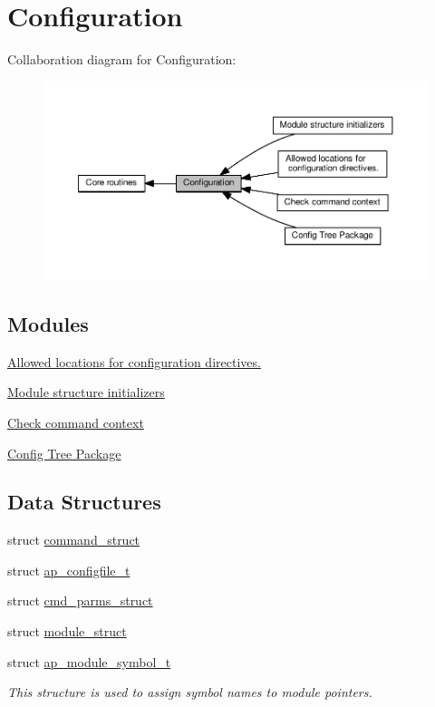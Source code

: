 \hypertarget{group__APACHE__CORE__CONFIG}{}\section{Configuration}
\label{group__APACHE__CORE__CONFIG}
Collaboration diagram for Configuration\+:
\nopagebreak
\begin{figure}[H]
\begin{center}
\leavevmode
\includegraphics[width=350pt]{group__APACHE__CORE__CONFIG}
\end{center}
\end{figure}
\subsection*{Modules}
\begin{DoxyCompactItemize}
\item 
\hyperlink{group__ConfigDirectives}{Allowed locations for configuration directives.}
\item 
\hyperlink{group__ModuleInit}{Module structure initializers}
\item 
\hyperlink{group__ap__check__cmd__context}{Check command context}
\item 
\hyperlink{group__APACHE__CORE__CONFIG__TREE}{Config Tree Package}
\end{DoxyCompactItemize}
\subsection*{Data Structures}
\begin{DoxyCompactItemize}
\item 
struct \hyperlink{structcommand__struct}{command\+\_\+struct}
\item 
struct \hyperlink{structap__configfile__t}{ap\+\_\+configfile\+\_\+t}
\item 
struct \hyperlink{structcmd__parms__struct}{cmd\+\_\+parms\+\_\+struct}
\item 
struct \hyperlink{structmodule__struct}{module\+\_\+struct}
\item 
struct \hyperlink{structap__module__symbol__t}{ap\+\_\+module\+\_\+symbol\+\_\+t}
\begin{DoxyCompactList}\small\item\em This structure is used to assign symbol names to module pointers. \end{DoxyCompactList}\end{DoxyCompactItemize}

